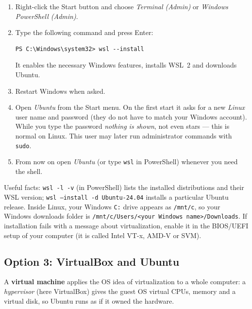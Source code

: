 \documentclass[11pt,a4paper]{article}
\newcommand{\term}[1]{\textbf{\color{mintdeep}#1}}
\newcommand{\cmd}[1]{\texttt{#1}}
\begin{document}
\begin{enumerate}[leftmargin=1.4em]
  \item Right-click the Start button and choose \emph{Terminal (Admin)} or \emph{Windows PowerShell (Admin)}.
  \item Type the following command and press Enter:
\begin{lstlisting}[style=term]
PS C:\Windows\system32> wsl --install
\end{lstlisting}
  It enables the necessary Windows features, installs WSL~2 and downloads Ubuntu.
  \item Restart Windows when asked.
  \item Open \emph{Ubuntu} from the Start menu. On the first start it asks for a new \emph{Linux} user name and password (they do not have to match your Windows account). While you type the password \emph{nothing is shown}, not even stars --- this is normal on Linux. This user may later run administrator commands with \cmd{sudo}.
  \item From now on open \emph{Ubuntu} (or type \cmd{wsl} in PowerShell) whenever you need the shell.
\end{enumerate}

Useful facts: \cmd{wsl -l -v} (in PowerShell) lists the installed distributions and their WSL version; \cmd{wsl --install -d Ubuntu-24.04} installs a particular Ubuntu release. Inside Linux, your Windows \texttt{C:} drive appears as \texttt{/mnt/c}, so your Windows downloads folder is \texttt{/mnt/c/Users/<your Windows name>/Downloads}. If installation fails with a message about virtualization, enable it in the BIOS/UEFI setup of your computer (it is called Intel VT-x, AMD-V or SVM).

\subsection{Option 3: VirtualBox and Ubuntu}
A \term{virtual machine} applies the OS idea of virtualization to a whole computer: a \emph{hypervisor} (here VirtualBox) gives the guest OS virtual CPUs, memory and a virtual disk, so Ubuntu runs as if it owned the hardware.
\end{document}
